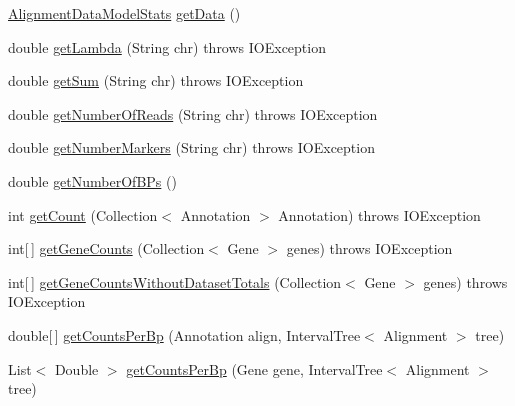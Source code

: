 \begin{DoxyCompactItemize}
\item 
\hyperlink{classbroad_1_1pda_1_1seq_1_1segmentation_1_1_alignment_data_model_stats}{Alignment\+Data\+Model\+Stats} \hyperlink{classbroad_1_1pda_1_1seq_1_1segmentation_1_1_continuous_data_alignment_model_a5f78dee2ade4678e5ac2d04576c83b6d}{get\+Data} ()
\item 
double \hyperlink{classbroad_1_1pda_1_1seq_1_1segmentation_1_1_continuous_data_alignment_model_a16fcd43426d01ba29a6e50d8a36ab38f}{get\+Lambda} (String chr)  throws I\+O\+Exception
\item 
double \hyperlink{classbroad_1_1pda_1_1seq_1_1segmentation_1_1_continuous_data_alignment_model_a68033365b74f1d7755eb6e712f47f863}{get\+Sum} (String chr)  throws I\+O\+Exception
\item 
double \hyperlink{classbroad_1_1pda_1_1seq_1_1segmentation_1_1_continuous_data_alignment_model_affc935b97a13f0fc855cd5c1878dc8b2}{get\+Number\+Of\+Reads} (String chr)  throws I\+O\+Exception
\item 
double \hyperlink{classbroad_1_1pda_1_1seq_1_1segmentation_1_1_continuous_data_alignment_model_adba4f6a27c198a96fcfa79a643fca0a3}{get\+Number\+Markers} (String chr)  throws I\+O\+Exception
\item 
double \hyperlink{classbroad_1_1pda_1_1seq_1_1segmentation_1_1_continuous_data_alignment_model_a5b689c01b77461487789d172e013a3f6}{get\+Number\+Of\+B\+Ps} ()
\item 
int \hyperlink{classbroad_1_1pda_1_1seq_1_1segmentation_1_1_continuous_data_alignment_model_a8e4c4c86479ee745866baef364fdd6fe}{get\+Count} (Collection$<$ Annotation $>$ Annotation)  throws I\+O\+Exception 
\item 
int\mbox{[}$\,$\mbox{]} \hyperlink{classbroad_1_1pda_1_1seq_1_1segmentation_1_1_continuous_data_alignment_model_aaee0b9274c46753d21f44590c58c072c}{get\+Gene\+Counts} (Collection$<$ Gene $>$ genes)  throws I\+O\+Exception
\item 
int\mbox{[}$\,$\mbox{]} \hyperlink{classbroad_1_1pda_1_1seq_1_1segmentation_1_1_continuous_data_alignment_model_a76ef156f96e86fe1eea8b45e94d22f02}{get\+Gene\+Counts\+Without\+Dataset\+Totals} (Collection$<$ Gene $>$ genes)  throws I\+O\+Exception
\item 
double\mbox{[}$\,$\mbox{]} \hyperlink{classbroad_1_1pda_1_1seq_1_1segmentation_1_1_continuous_data_alignment_model_acd9c8501fd75af7cb102cd6886cbe15b}{get\+Counts\+Per\+Bp} (Annotation align, Interval\+Tree$<$ Alignment $>$ tree)
\item 
List$<$ Double $>$ \hyperlink{classbroad_1_1pda_1_1seq_1_1segmentation_1_1_continuous_data_alignment_model_a2f5c2e47fe3a39cb416bfddf280e2c7f}{get\+Counts\+Per\+Bp} (Gene gene, Interval\+Tree$<$ Alignment $>$ tree)

\end{DoxyCompactItemize}
